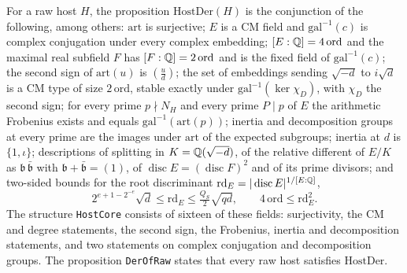 \begin{definition}\label{host:host-der}
For a raw host $H$, the proposition $\mathrm{HostDer}(H)$ is the conjunction
of the following, among others: $\mathrm{art}$ is surjective; $E$ is a CM
field and $\mathrm{gal}^{-1}(c)$ is complex conjugation under every complex
embedding; $[E:\mathbb{Q}]=4\,\mathrm{ord}$ and the maximal real subfield $F$ has
$[F:\mathbb{Q}]=2\,\mathrm{ord}$ and is the fixed field of $\mathrm{gal}^{-1}(c)$;
the second sign of $\mathrm{art}(u)$ is $\left(\frac ud\right)$; the set of
embeddings sending $\sqrt{-d}$ to $i\sqrt d$ is a CM type of size
$2\,\mathrm{ord}$, stable exactly under $\mathrm{gal}^{-1}(\ker\chi_D)$, with
$\chi_D$ the second sign; for every prime $p\nmid N_H$ and every prime
$P\mid p$ of $E$ the arithmetic Frobenius exists and equals
$\mathrm{gal}^{-1}(\mathrm{art}(p))$; inertia and decomposition groups at
every prime are the images under $\mathrm{art}$ of the expected subgroups;
inertia at $d$ is $\{1,\iota\}$; descriptions of splitting in
$K=\mathbb{Q}(\sqrt{-d})$, of the relative different of $E/K$ as $\mathfrak b\,
\bar{\mathfrak b}$ with $\mathfrak b+\bar{\mathfrak b}=(1)$, of
$\operatorname{disc}E=(\operatorname{disc}F)^2$ and of its prime divisors;
and two-sided bounds for the root discriminant
$\mathrm{rd}_E=|\operatorname{disc}E|^{1/[E:\mathbb{Q}]}$,
\[
2^{e+1-2^{-e}}\sqrt d\le\mathrm{rd}_E\le\tfrac{Q_S}{2}\sqrt{qd},\qquad
4\,\mathrm{ord}\le\mathrm{rd}_E^2 .
\]
The structure \texttt{HostCore} consists of sixteen of these fields:
surjectivity, the CM and degree statements, the second sign, the
Frobenius, inertia and decomposition statements, and two statements on
complex conjugation and decomposition groups.
The proposition \texttt{DerOfRaw} states that every raw host satisfies
$\mathrm{HostDer}$.
\end{definition}

